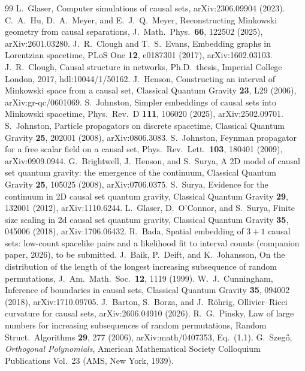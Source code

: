 \documentclass[prd,twocolumn,superscriptaddress,nofootinbib,amsmath,amssymb,floatfix]{revtex4-2}
\begin{document}
\begin{thebibliography}{99}
 L.~Glaser, Computer simulations of causal sets, arXiv:2306.09904 (2023).
 C.~A.~Hu, D.~A.~Meyer, and E.~J.~Q.~Meyer, Reconstructing Minkowski geometry from causal separations, J.\ Math.\ Phys.\ \textbf{66}, 122502 (2025), arXiv:2601.03280.
 J.~R.~Clough and T.~S.~Evans, Embedding graphs in Lorentzian spacetime, PLoS One \textbf{12}, e0187301 (2017), arXiv:1602.03103.
 J.~R.~Clough, Causal structure in networks, Ph.D.\ thesis, Imperial College London, 2017, hdl:10044/1/50162.
 J.~Henson, Constructing an interval of Minkowski space from a causal set, Classical Quantum Gravity \textbf{23}, L29 (2006), arXiv:gr-qc/0601069.
 S.~Johnston, Simpler embeddings of causal sets into Minkowski spacetime, Phys.\ Rev.\ D \textbf{111}, 106020 (2025), arXiv:2502.09701.
 S.~Johnston, Particle propagators on discrete spacetime, Classical Quantum Gravity \textbf{25}, 202001 (2008), arXiv:0806.3083.
 S.~Johnston, Feynman propagator for a free scalar field on a causal set, Phys.\ Rev.\ Lett.\ \textbf{103}, 180401 (2009), arXiv:0909.0944.
 G.~Brightwell, J.~Henson, and S.~Surya, A 2D model of causal set quantum gravity: the emergence of the continuum, Classical Quantum Gravity \textbf{25}, 105025 (2008), arXiv:0706.0375.
 S.~Surya, Evidence for the continuum in 2D causal set quantum gravity, Classical Quantum Gravity \textbf{29}, 132001 (2012), arXiv:1110.6244.
 L.~Glaser, D.~O'Connor, and S.~Surya, Finite size scaling in 2d causal set quantum gravity, Classical Quantum Gravity \textbf{35}, 045006 (2018), arXiv:1706.06432.
 R.~Bada, Spatial embedding of $3+1$ causal sets: low-count spacelike pairs and a likelihood fit to interval counts (companion paper, 2026), to be submitted.
 J.~Baik, P.~Deift, and K.~Johansson, On the distribution of the length of the longest increasing subsequence of random permutations, J.\ Am.\ Math.\ Soc.\ \textbf{12}, 1119 (1999).
 W.~J.~Cunningham, Inference of boundaries in causal sets, Classical Quantum Gravity \textbf{35}, 094002 (2018), arXiv:1710.09705.
 J.~Barton, S.~Borza, and J.~R\"ohrig, Ollivier--Ricci curvature for causal sets, arXiv:2606.04910 (2026).
 R.~G.~Pinsky, Law of large numbers for increasing subsequences of random permutations, Random Struct.\ Algorithms \textbf{29}, 277 (2006), arXiv:math/0407353, Eq.~(1.1).
 G.~Szeg\H{o}, \emph{Orthogonal Polynomials}, American Mathematical Society Colloquium Publications Vol.~23 (AMS, New York, 1939).

\end{thebibliography}
\end{document}
